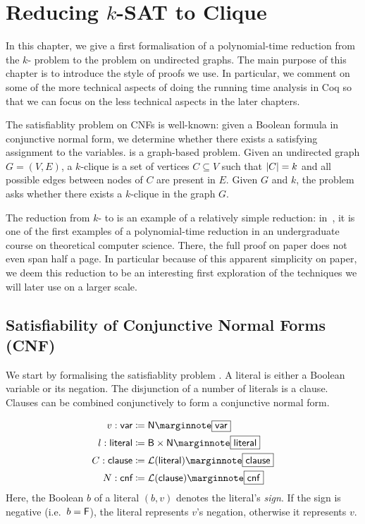 \newcommand{\varBound}{\textsf{varBound}}
\newcommand{\maxVar}{\textsf{maxVar}}

\chapter{Reducing $k$-SAT to Clique}\label{chap:ksat_clique}
In this chapter, we give a first formalisation of a polynomial-time reduction from the $k$-\SAT{} problem to the \Clique{} problem on undirected graphs. The main purpose of this chapter is to introduce the style of proofs we use. In particular, we comment on some of the more technical aspects of doing the running time analysis in Coq so that we can focus on the less technical aspects in the later chapters. 

The satisfiablity problem on CNFs is well-known: given a Boolean formula in conjunctive normal form, we determine whether there exists a satisfying assignment to the variables. 
\Clique{} is a graph-based problem. Given an undirected graph $G = (V, E)$, a $k$-clique is a set of vertices $C \subseteq V$ such that $|C| = k$ and all possible edges between nodes of $C$ are present in $E$. Given $G$ and $k$, the \Clique{} problem asks whether there exists a $k$-clique in the graph $G$. 

The reduction from $k$-\SAT{} to \Clique{} is an example of a relatively simple reduction: in~\cite{Bläser:TISkript}, it is one of the first examples of a polynomial-time reduction in an undergraduate course on theoretical computer science. There, the full proof on paper does not even span half a page. 
In particular because of this apparent simplicity on paper, we deem this reduction to be an interesting first exploration of the techniques we will later use on a larger scale.

\section{Satisfiability of Conjunctive Normal Forms (CNF)}\label{sec:sat}
We start by formalising the satisfiablity problem \SAT{}.
A literal is either a Boolean variable or its negation. The disjunction of a number of literals is a clause. Clauses can be combined conjunctively to form a conjunctive normal form. 

\newcommand*{\bvar}{\textsf{var}}
\newcommand*{\literal}{\textsf{literal}}
\newcommand*{\clause}{\textsf{clause}}
\newcommand*{\cnf}{\textsf{cnf}}
\newcommand*{\assgn}{\textsf{assgn}}
\newcommand*{\eval}{\mathcal{E}}
\newcommand*{\evalA}[2]{\eval~#1~#2}
\begin{align*}
  v : \bvar &\defeq \nat \mnote{\bvar}\\
  l : \literal &\defeq \bool \times \nat \mnote{\literal}\\
  C : \clause &\defeq \listsof{\literal} \mnote{\clause}\\
  N : \cnf &\defeq \listsof{\clause} \mnote{\cnf}
\end{align*}
Here, the Boolean $b$ of a literal $(b, v)$ denotes the literal's \emph{sign}. If the sign is negative (i.e.\ $b = \mathsf{F}$), the literal represents $v$'s negation, otherwise it represents $v$.

